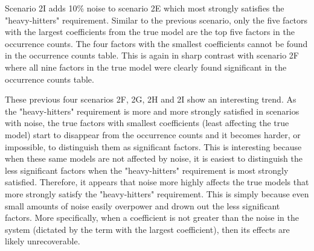 Scenario 2I adds 10\% noise to scenario 2E which most strongly satisfies the "heavy-hitters" requirement.
Similar to the previous scenario, only the five factors with the largest coefficients from the true model are the top five factors in the occurrence counts.
The four factors with the smallest coefficients cannot be found in the occurrence counts table.
This is again in sharp contrast with scenario 2F where all nine factors in the true model were clearly found significant in the occurrence counts table.

These previous four scenarios 2F, 2G, 2H and 2I show an interesting trend.
As the "heavy-hitters" requirement is more and more strongly satisfied in scenarios with noise, the true factors with smallest coefficients (least affecting the true model) start to disappear from the occurrence counts and it becomes harder, or impossible, to distinguish them as significant factors.
This is interesting because when these same models are not affected by noise, it is easiest to distinguish the less significant factors when the "heavy-hitters" requirement is most strongly satisfied.
Therefore, it appears that noise more highly affects the true models that more strongly satisfy the "heavy-hitters" requirement.
This is simply because even small amounts of noise easily overpower and drown out the less significant factors.
More specifically, when a coefficient is not greater than the noise in the system (dictated by the term with the largest coefficient), then its effects are likely unrecoverable.

